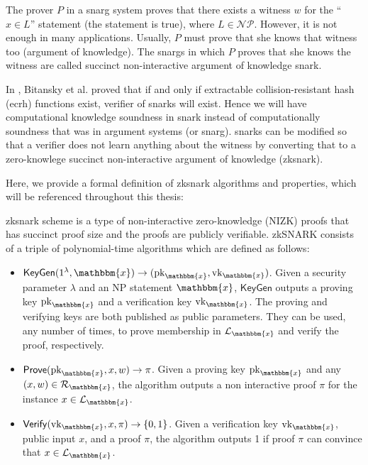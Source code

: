 The prover $P$ in a \gls{snarg} system proves that there exists a witness $w$ for the  ``$x \in L$''  statement (the statement is true), where $L\in \mathcal{NP}$. However, it is not enough in many applications. Usually, $P$ must prove that she knows that witness too (argument of knowledge).  The \gls{snarg}s in which $P$ proves that she knows the witness are called succinct non-interactive argument of knowledge \gls{snark}. 

In \cite{Bitansky2012}, Bitansky et al. proved that if and only if  extractable collision-resistant hash (\gls{ecrh}) functions exist, verifier of \gls{snark}s will exist. Hence we will have computational knowledge soundness in \gls{snark} instead of computationally soundness that was in argument systems (or \gls{snarg}).  \gls{snark}s can be modified so that a verifier does not learn anything about the witness by converting that to a zero-knowlege succinct non-interactive argument of knowledge (\gls{zksnark}).  

Here, we provide a formal definition of \gls{zksnark} algorithms and properties, which will be referenced throughout this thesis:

\begin{definition}
	\label{def:Algorithms in a zkSNARK scheme}
	
	\gls{zksnark} scheme is a type of non-interactive zero-knowledge (NIZK) proofs that has succinct proof size and the proofs are publicly verifiable. zkSNARK consists of a triple of polynomial-time algorithms which are defined as follows:
	
	\begin{itemize}
		\item $\mathsf{KeyGen}(1^{\lambda}, \mathbbm{x}) \rightarrow (\text{pk}_\mathbbm{x}, \text{vk}_\mathbbm{x})$. Given a security parameter $\lambda$ and an NP statement $\mathbbm{x}$, $\mathsf{KeyGen}$ outputs a proving key $\text{pk}_\mathbbm{x}$ and a verification key $\text{vk}_\mathbbm{x}$. The proving and verifying keys are both published as public parameters. They can be used, any number of times, to prove membership in $\mathcal{L}_\mathbbm{x}$ and verify the proof, respectively.
		
		\item $\mathsf{Prove}(\text{pk}_\mathbbm{x}, x, w) \rightarrow \pi$. Given a proving key $\text{pk}_\mathbbm{x}$ and any $(x, w) \in \mathcal{R}_\mathbbm{x}$, the algorithm outputs a non interactive proof $\pi$ for the instance $x\in \mathcal{L}_\mathbbm{x}$.
		
		\item $\mathsf{Verify}(\text{vk}_\mathbbm{x}, x, \pi) \rightarrow \{0, 1\}$. Given a verification key $\text{vk}_\mathbbm{x}$, public input $x$, and a proof $\pi$, the algorithm outputs 1 if proof $\pi$ can convince that $x\in \mathcal{L}_\mathbbm{x}$.
	\end{itemize}
	
\end{definition}

